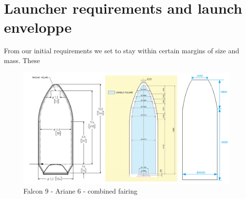 \chapter{Launcher requirements and launch enveloppe}

From our initial requirements we set to stay within certain margins of size and mass. These 


\begin{figure}[H]
    \centering
    \includegraphics{enveloppe}
    \caption{Falcon 9 - Ariane 6 - combined fairing}
    \label{fig:my_label}
\end{figure}